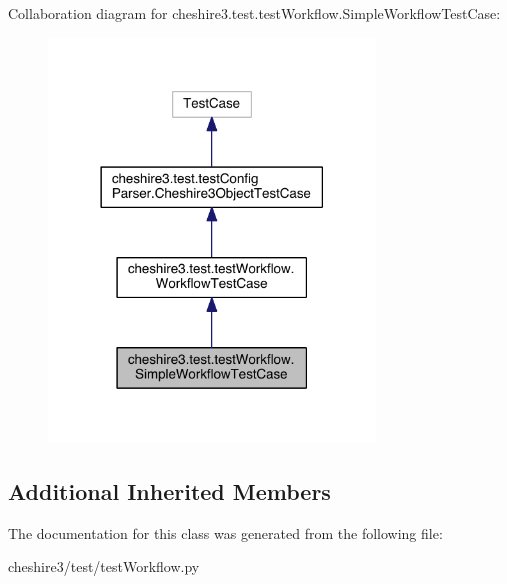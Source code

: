 Collaboration diagram for cheshire3.\-test.\-test\-Workflow.\-Simple\-Workflow\-Test\-Case\-:
\nopagebreak
\begin{figure}[H]
\begin{center}
\leavevmode
\includegraphics[width=246pt]{classcheshire3_1_1test_1_1test_workflow_1_1_simple_workflow_test_case__coll__graph}
\end{center}
\end{figure}
\subsection*{Additional Inherited Members}


The documentation for this class was generated from the following file\-:\begin{DoxyCompactItemize}
\item 
cheshire3/test/test\-Workflow.\-py\end{DoxyCompactItemize}

